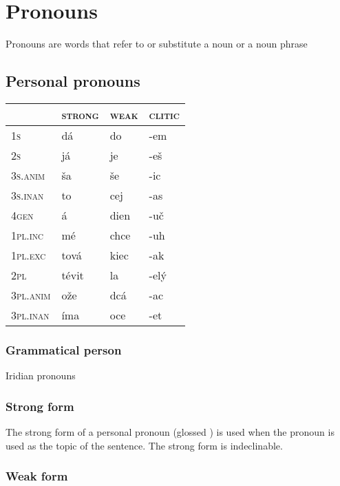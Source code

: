 \chapter{Pronouns}

Pronouns are words that refer to or substitute a noun or a noun phrase

\section{Personal pronouns}

\begin{table}[h!]
	\centering\small
	\begin{tabularx}{0.8\textwidth}{>{\scshape}YMMM}
		\toprule
		 &\textsc{strong} &\textsc{weak}&\textsc{clitic}\\
		\midrule
		1s &dá&do&-em\\ \addlinespace
		2s&já&je&-e\v{s}\\ \addlinespace
		3s.anim&\v{s}a&\v{s}e&-ic\\ \addlinespace
		3s.inan&to&cej&-as\\ \addlinespace
		4gen&á&dien&-u\v{c}\\ \addlinespace
		1pl.inc&m\'e&chce&-uh\\ \addlinespace
		1pl.exc&tov\'a&kiec&-ak\\ \addlinespace
		2pl&t\'evit&la&-elý\\ \addlinespace
		3pl.anim&o\v{z}e&dcá&-ac\\ \addlinespace
		3pl.inan&\'ima&oce&-et\\ \bottomrule
	\end{tabularx}
\end{table}

\subsection{Grammatical person}
Iridian pronouns
\subsection{Strong form}

The strong form of a personal pronoun (glossed ) is used when the pronoun is used as the topic of the sentence. The strong form is indeclinable.

\subsection{Weak form}

